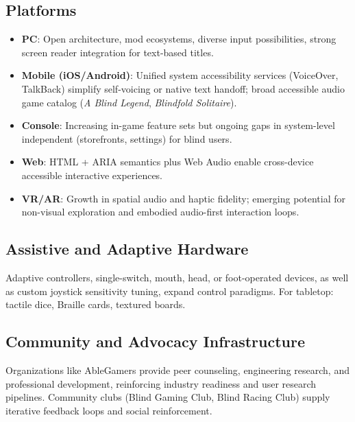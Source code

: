 \subsection*{Platforms}
\begin{itemize}
	\item \textbf{PC}: Open architecture, mod ecosystems, diverse input possibilities, strong screen reader integration for text-based titles\supercite{GitHubGameEngines}.
	\item \textbf{Mobile (iOS/Android)}: Unified system accessibility services (VoiceOver, TalkBack) simplify self-voicing or native text handoff; broad accessible audio game catalog (\textit{A Blind Legend}, \textit{Blindfold Solitaire})\supercite{AppleStoreBlindLegend,AppleStoreSolitaire}.
	\item \textbf{Console}: Increasing in-game feature sets but ongoing gaps in system-level independent  (storefronts, settings) for blind users\supercite{LudaccessList,ScopeGamingReport}.
	\item \textbf{Web}: HTML + ARIA semantics plus Web Audio enable cross-device accessible interactive experiences.
	\item \textbf{VR/AR}: Growth in spatial audio and haptic fidelity; emerging potential for non-visual exploration and embodied audio-first interaction loops\supercite{SlavnaStudio2025}.
\end{itemize}

\subsection*{Assistive and Adaptive Hardware}
Adaptive controllers, single-switch, mouth, head, or foot-operated devices, as well as custom joystick sensitivity tuning, expand control paradigms\supercite{ScopeGamingReport}. For tabletop: tactile dice, Braille cards, textured boards\supercite{CarrollCenterGames}.

\subsection*{Community and Advocacy Infrastructure}
Organizations like AbleGamers provide peer counseling, engineering research, and professional development, reinforcing industry readiness and user research pipelines\supercite{AbleGamers2025}. Community clubs (Blind Gaming Club, Blind Racing Club) supply iterative feedback loops and social reinforcement.

